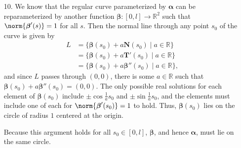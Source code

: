 \documentclass[a4paper,12pt]{article}
\newcommand{\bs}{\boldsymbol}
\theoremstyle{remark}
\begin{document}
\begin{enumerate}
    \item[10.]
        We know that the regular curve parameterized by $\bs{\alpha}$ can be reparameterized by another function $\bs{\beta} : [0, l] \to \mathbb{R}^2$ such that $\norm{\bs{\beta}'(s)} = 1$ for all $s$. Then the normal line through any point $s_0$ of the curve is given by
        \begin{align*}
            L &= \{ \bs{\beta}(s_0) + a \bs{N}(s_0) \mid a \in \mathbb{R} \} \\
            &= \{ \bs{\beta}(s_0) + a \bs{T}'(s_0) \mid a \in \mathbb{R} \} \\
            &= \{ \bs{\beta}(s_0) + a \bs{\beta}''(s_0) \mid a \in \mathbb{R} \},
        \end{align*}
        and since $L$ passes through $(0, 0)$, there is some $a \in \mathbb{R}$ such that $\bs{\beta}(s_0) + a \bs{\beta}''(s_0) = (0, 0)$. The only possible real solutions for each element of $\bs{\beta}(s_0)$ include $\pm \cos \frac{1}{a}s_0$ and $\pm \sin \frac{1}{a}s_0$, and the elements must include one of each for $\norm{\bs{\beta}'(s_0)} = 1$ to hold. Thus, $\bs{\beta}(s_0)$ lies on the circle of radius $1$ centered at the origin. \par
        Because this argument holds for all $s_0 \in [0, l]$, $\bs{\beta}$, and hence $\bs{\alpha}$, must lie on the same circle.
\end{enumerate}
\end{document}
